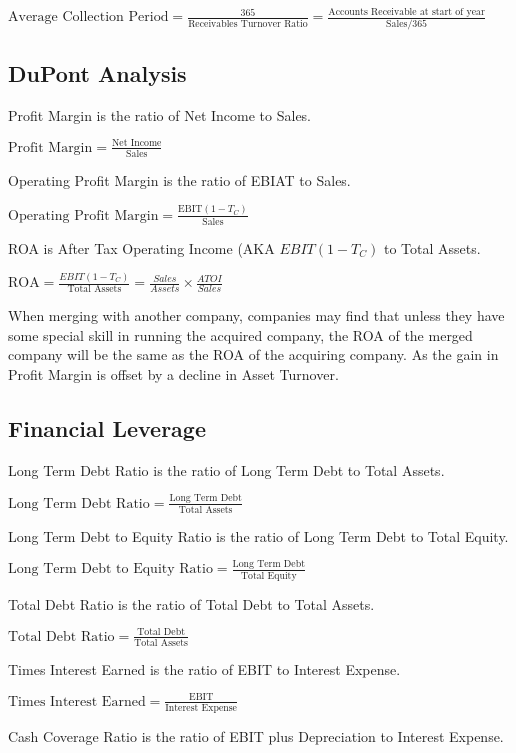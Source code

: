 $\text{Average Collection Period} = \frac{365}{\text{Receivables Turnover Ratio}} = \frac{\text{Accounts Receivable at start of year}}{\text{Sales}/ 365}$

\subsection{DuPont Analysis}

Profit Margin is the ratio of Net Income to Sales.

$\text{Profit Margin} = \frac{\text{Net Income}}{\text{Sales}}$

Operating Profit Margin is the ratio of EBIAT to Sales.

$\text{Operating Profit Margin} = \frac{\text{EBIT}(1-T_C)}{\text{Sales}}$

ROA is After Tax Operating Income (AKA $EBIT(1-T_C)$ to Total Assets.

$\text{ROA} = \frac{EBIT(1-T_C)}{\text{Total Assets}} = \frac{Sales}{Assets}\times \frac{ATOI}{Sales}$

When merging with another company, companies may find that unless they have some special skill
in running the acquired company, the ROA of the merged company will be the same as the ROA of the acquiring company. As the gain in Profit Margin is offset by a decline in Asset Turnover.


\subsection{Financial Leverage}

Long Term Debt Ratio is the ratio of Long Term Debt to Total Assets.

$\text{Long Term Debt Ratio} = \frac{\text{Long Term Debt}}{\text{Total Assets}}$

Long Term Debt to Equity Ratio is the ratio of Long Term Debt to Total Equity.

$\text{Long Term Debt to Equity Ratio} = \frac{\text{Long Term Debt}}{\text{Total Equity}}$

Total Debt Ratio is the ratio of Total Debt to Total Assets.

$\text{Total Debt Ratio} = \frac{\text{Total Debt}}{\text{Total Assets}}$

Times Interest Earned is the ratio of EBIT to Interest Expense.

$\text{Times Interest Earned} = \frac{\text{EBIT}}{\text{Interest Expense}}$

Cash Coverage Ratio is the ratio of EBIT plus Depreciation to Interest Expense.

